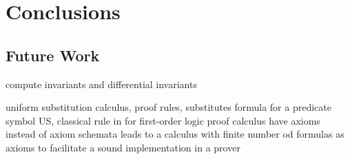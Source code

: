 \chapter{Conclusions}
    \section{Future Work}
    	compute invariants and differential invariants

    	uniform substitution calculus, proof rules, substitutes formula for a predicate symbol
    	US, classical rule in for first-order logic proof calculus
    	have axioms instead of axiom schemata
    	leads to a calculus with finite number od \ddL formulas as axioms
    	to facilitate a sound implementation in a prover
